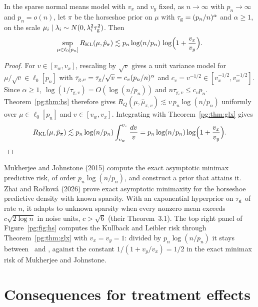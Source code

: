 \begin{corollary}\label{pg:cor:hspred}
In the sparse normal means model with $v_x$ and $v_y$ fixed, as $n\to\infty$ with $p_n\to\infty$ and $p_n = o(n)$, let $\pi$ be the horseshoe prior on $\mu$ with $\tau_{\mathrm{g}} = (p_n/n)^\alpha$ and $\alpha\ge1$, on the scale $\mu_i\mid\lambda_i\sim N(0,\lambda_i^2\tau_{\mathrm{g}}^2)$. Then
\[
\sup_{\mu\in\ell_0[p_n]}R_{\mathrm{KL}}(\mu,\hat p_\pi) \lesssim p_n\log(n/p_n)\,\log\Bigl(1 + \frac{v_x}{v_y}\Bigr).
\]
\end{corollary}
\begin{proof}
For $v\in[v_w,v_x]$, rescaling by $\sqrt v$ gives a unit variance model for $\mu/\sqrt v\in\ell_0[p_n]$ with $\tau_{\mathrm{g},v}=\tau_{\mathrm{g}}/\sqrt v=c_v(p_n/n)^\alpha$ and $c_v=v^{-1/2}\in[v_x^{-1/2},v_w^{-1/2}]$. Since $\alpha\ge1$, $\log(1/\tau_{\mathrm{g},v})=O(\log(n/p_n))$ and $n\tau_{\mathrm{g},v}\le c_vp_n$. Theorem~\ref{pg:thm:hs} therefore gives $R_Q(\mu,\hat\mu_{\pi,v})\lesssim v\,p_n\log(n/p_n)$ uniformly over $\mu\in\ell_0[p_n]$ and $v\in[v_w,v_x]$. Integrating with Theorem~\ref{pg:thm:glx} gives
\[
R_{\mathrm{KL}}(\mu,\hat p_\pi)\lesssim p_n\log(n/p_n)\int_{v_w}^{v_x}\frac{dv}{v}=p_n\log(n/p_n)\log\Bigl(1+\frac{v_x}{v_y}\Bigr).
\]
\end{proof}

Mukherjee and Johnstone (2015) compute the exact asymptotic minimax predictive risk, of order $p_n\log(n/p_n)$, and construct a prior that attains it. Zhai and Ro\v{c}kov\'a (2026) prove exact asymptotic minimaxity for the horseshoe predictive density with known sparsity. With an exponential hyperprior on $\tau_{\mathrm{g}}$ of rate $n$, it adapts to unknown sparsity when every nonzero mean exceeds $c\sqrt{2\log n}$ in noise units, $c>\sqrt6$ (their Theorem~3.1). The top right panel of Figure~\ref{pg:fig:hs} computes the Kullback and Leibler risk through Theorem~\ref{pg:thm:glx} with $v_x = v_y = 1$: divided by $p_n\log(n/p_n)$ it stays between \pgkmin\ and \pgkmax, against the constant $1/(1+v_y/v_x) = 1/2$ in the exact minimax risk of Mukherjee and Johnstone.

\section{Consequences for treatment effects}\label{pg:sec:causal}

